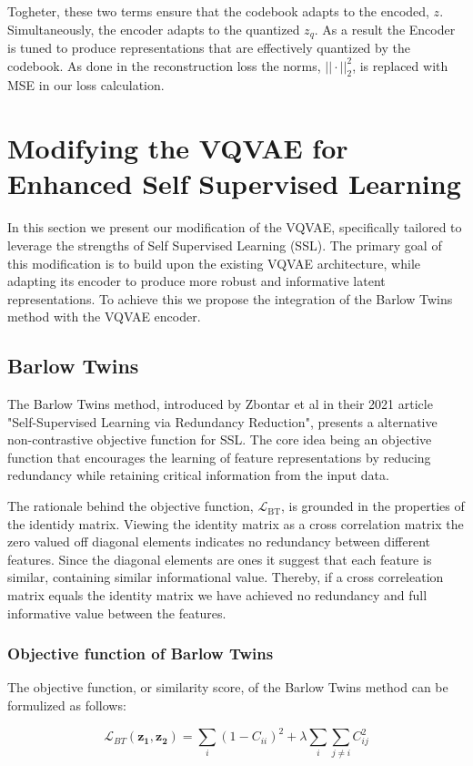 Togheter, these two terms ensure that the codebook adapts to the encoded, $z$. Simultaneously, the encoder adapts to the quantized $z_q$. As a result the Encoder is tuned to produce representations that are effectively quantized by the codebook.
As done in the reconstruction loss the norms, $||\cdot||_2^2$, is replaced with MSE in our loss  calculation.
\section{Modifying the VQVAE for Enhanced Self Supervised Learning}
In this section we present our modification of the VQVAE, specifically tailored to leverage the strengths of Self Supervised Learning (SSL).
The primary goal of this modification is to build upon the existing VQVAE architecture, while adapting its encoder to produce more robust and informative latent representations.
To achieve this we propose the integration of the Barlow Twins method with the VQVAE encoder.


\subsection{Barlow Twins}
The Barlow Twins method, introduced by Zbontar et al in their 2021 article "Self-Supervised Learning via Redundancy Reduction"\cite{Barlow}, presents a alternative non-contrastive objective function for SSL. The core idea being an objective function that encourages the learning of feature representations
by reducing redundancy while retaining critical information from the input data. 

The rationale behind the objective function, $\mathcal{L}_{\text{BT}}$, is grounded in the properties of the identidy matrix. Viewing the identity matrix as a cross correlation matrix the zero valued off diagonal elements indicates no redundancy between different features. Since the diagonal elements are ones it suggest that each feature is similar, containing similar informational value.
Thereby, if a cross correleation matrix equals the identity matrix we have achieved no redundancy and full informative value between the features.

\subsubsection{Objective function of Barlow Twins}
The objective function, or similarity score, of the Barlow Twins method can be formulized as follows:

\begin{equation}
\mathcal{L}_{BT}(\mathbf{z_1}, \mathbf{z_2}) = \sum_i (1 - C_{ii})^2 + \lambda \sum_i \sum_{j \neq i} C_{ij}^2
\end{equation}

